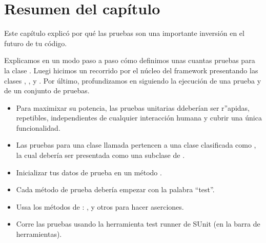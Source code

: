 \documentclass[a4paper,10pt,twoside]{book}
\begin{document}



\section{Resumen del cap\'itulo}

Este cap\'itulo explic\'o por qu\'e las pruebas son una importante inversi\'on
en el futuro de tu c\'odigo.

Explicamos en un modo paso a paso c\'omo definimos unas cuantas pruebas para la clase .
Luegi hicimos un recorrido por el n\'ucleo del framework \sunit presentando
las clases  , , 
y . Por \'ultimo, profundizamos en \sunit siguiendo la ejecuci\'on de una prueba y de un
conjunto de pruebas.

\begin{itemize}
  \item Para maximixar su potencia, las pruebas unitarias ddeber\'ian ser r''apidas, repetibles, independientes de cualquier interacci\'on humana y cubrir una \'unica funcionalidad.

  \item Las pruebas para una clase llamada  pertencen a una clase clasificada como , la cual deber\'ia ser presentada como una subclase de .
  \item Inicializar tus datos de prueba en un m\'etodo .
  \item Cada m\'etodo de prueba deber\'ia empezar con la palabra ``test''.
  \item Ussa los m\'etodos de  :  ,  y otros para hacer aserciones.
  \item Corre las pruebas usando la herramienta test runner de SUnit (en la barra de herramientas).
\end{itemize}

\ifx\wholebook\relax\else
   
   
\end{document}
